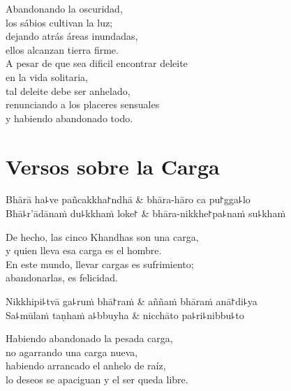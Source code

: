 \begin{english}
  Abandonando la oscuridad,\\
  los sábios cultivan la luz;\\
  dejando atrás áreas inundadas,\\
  ellos alcanzan tierra firme.\\
  A pesar de que sea dificil encontrar deleite\\
  en la vida solitaria,\\
  tal deleite debe ser anhelado,\\
  renunciando a los placeres sensuales\\
  y habiendo abandonado todo.
\end{english}

\chapter{Versos sobre la Carga}


\begin{leader}
\end{leader}

\begin{twochants}
Bhārā ha꜕ve pañcakkha꜓ndhā & bhāra-hāro ca pu꜓gga꜕lo \\
Bhā꜕r'ādānaṁ du꜕kkhaṁ loke꜓ & bhāra-nikkhe꜓pa꜕naṁ su꜕khaṁ \\
\end{twochants}

\begin{english}
  De hecho, las cinco Khandhas son una carga,\\
  y quien lleva esa carga es el hombre.\\
  En este mundo, llevar cargas es sufrimiento;\\
  abandonarlas, es felicidad.
\end{english}

\begin{twochants}
Nikkhipi꜕tvā ga꜕ruṁ bhā꜓raṁ & aññaṁ bhāraṁ anā꜓di꜕ya \\
Sa꜕mūlaṁ taṇhaṁ a꜕bbuyha & nicchāto pa꜕ri꜕nibbu꜕to \\
\end{twochants}

\begin{english}
  Habiendo abandonado la pesada carga,\\
  no agarrando una carga nueva,\\
  habiendo arrancado el anhelo de raíz,\\
  lo deseos se apaciguan y el ser queda libre.
\end{english}

